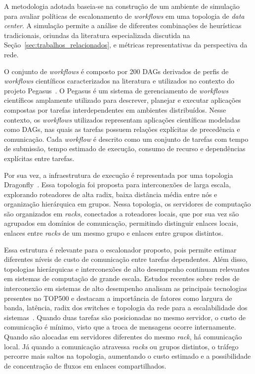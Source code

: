 \documentclass[12pt]{article}
\begin{document}
A metodologia adotada baseia-se na construção de um ambiente de simulação para avaliar políticas de escalonamento de \textit{workflows} em uma topologia de \textit{data center}. 
%
A simulação permite a análise de diferentes combinações de heurísticas tradicionais, oriundas da literatura especializada discutida na Seção~\ref{sec:trabalhos_relacionados}, e métricas representativas da perspectiva da rede.

O conjunto de \textit{workflows} é composto por 200 DAGs derivados de perfis de \textit{workflows} científicos caracterizados na literatura e utilizados no contexto do projeto Pegasus~\cite{juve2013characterizing,deelman2019pegasus}. 
%
O Pegasus é um sistema de gerenciamento de \textit{workflows} científicos amplamente utilizado para descrever, planejar e executar aplicações compostas por tarefas interdependentes em ambientes distribuídos. 
%
Nesse contexto, os \textit{workflows} utilizados representam aplicações científicas modeladas como DAGs, nas quais as tarefas possuem relações explícitas de precedência e comunicação.
%
Cada \textit{workflow} é descrito como um conjunto de tarefas com tempo de submissão, tempo estimado de execução, consumo de recurso e dependências explícitas entre tarefas.

Por sua vez, a infraestrutura de execução é representada por uma topologia Dragonfly~\cite{kim2008technology}. 
%
Essa topologia foi proposta para interconexões de larga escala, explorando roteadores de alta radix, baixa distância média entre nós e organização hierárquica em grupos. 
%
Nessa topologia, os servidores de computação são organizados em \textit{racks}, conectados a roteadores locais, que por sua vez são agrupados em domínios de comunicação, permitindo distinguir enlaces locais, enlaces entre \textit{racks} de um mesmo grupo e enlaces entre grupos distintos.

Essa estrutura é relevante para o escalonador proposto, pois permite estimar diferentes níveis de custo de comunicação entre tarefas dependentes. 
%
Além disso, topologias hierárquicas e interconexões de alto desempenho continuam relevantes em sistemas de computação de grande escala. Estudos recentes sobre redes de interconexão em sistemas de alto desempenho analisam as principais tecnologias presentes no TOP500 e destacam a importância de fatores como largura de banda, latência, radix dos switches e topologia da rede para a escalabilidade dos sistemas~\cite{lu2022survey,top5002025november}.
%
Quando duas tarefas são posicionadas no mesmo servidor, o custo de comunicação é mínimo, visto que a troca de mensagens ocorre internamente.
%
Quando são alocadas em servidores diferentes do mesmo \textit{rack}, há comunicação local. 
%
Já quando a comunicação atravessa \textit{racks} ou grupos distintos, o tráfego percorre mais saltos na topologia, aumentando o custo estimado e a possibilidade de concentração de fluxos em enlaces compartilhados.
\end{document}
